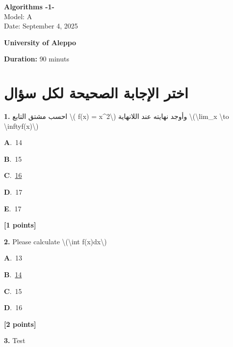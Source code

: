 \documentclass[12pt]{article}
\newcommand{\choice}[3]{%
  \noindent\textbf{#1}.~#2\hfill#3\par\vspace{0.25em}
}
\begin{document}
\begin{flushright}
{\Large \textbf{{\textenglish{Algorithms -1-}}}}\\[0.25em]
{\normalsize \textenglish{Model: }{\textenglish{A}}}\\[0.1em]
{\normalsize \textenglish{Date: }{\textenglish{September 4, 2025}}}
\end{flushright}

\vspace{0.6cm}

\noindent
\begin{minipage}[t]{0.65\textwidth}
  \raggedright
  \textbf{{\textenglish{University of Aleppo}}}\\[0.3em]
\end{minipage}\hfill
\begin{minipage}[t]{0.3\textwidth}
  \raggedleft
  \textenglish{\textbf{Duration: }}{\textenglish{90 minuts}}
\end{minipage}

\vspace{0.9cm}

\section*{اختر الإجابة الصحيحة لكل سؤال}

\noindent \textbf{\textenglish{1.}} {\textarabic{احسب مشتق التابع \textbackslash{}( f(x) = x\^{}2\textbackslash{}) وأوجد نهايته عند اللانهاية \textbackslash{}(\textbackslash{}lim\_{x \textbackslash{}to \textbackslash{}infty}f(x)\textbackslash{})}}

\noindent\choice{A}{{\textenglish{14}}}{}
\noindent\choice{B}{{\textenglish{15}}}{}
\noindent\choice{C}{\underline{{\textenglish{16}}}}{}
\noindent\choice{D}{{\textenglish{17}}}{}
\noindent\choice{E}{{\textenglish{17}}}{}
\hfill \textbf{[1 points]}\vspace{0.5em}

\noindent \textbf{\textenglish{2.}} {\textenglish{Please calculate \textbackslash{}(\textbackslash{}int f(x)dx\textbackslash{})}}

\noindent\choice{A}{{\textenglish{13}}}{}
\noindent\choice{B}{\underline{{\textenglish{14}}}}{}
\noindent\choice{C}{{\textenglish{15}}}{}
\noindent\choice{D}{{\textenglish{16}}}{}
\hfill \textbf{[2 points]}\vspace{0.5em}

\noindent \textbf{\textenglish{3.}} {\textenglish{Test}}
\end{document}
